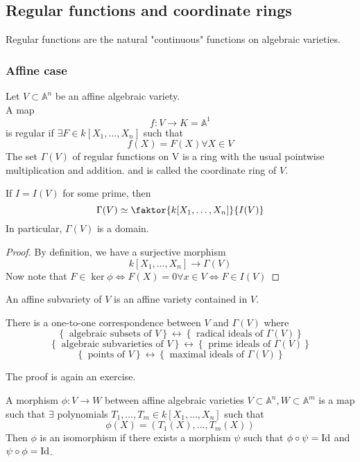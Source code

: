 \documentclass[../main.tex]{subfiles}
\begin{document}
\subsection{Regular functions and coordinate rings}
Regular functions are the natural "continuous" functions on algebraic varieties.
\subsubsection{Affine case}
\begin{defn}
	Let $V \subset \mathbb{A}^{n}$ be an affine algebraic variety.\\
	A map
	\[ 
	f:V\to K= \mathbb{A}^{1}
	\]
	is regular if $\exists F\in k[X_1,\ldots,X_n]$ such that 
	\[ 
	f( X) =F( X) \forall X\in V
	\]
	The set $\Gamma( V) $ of regular functions on V	is a ring with the usual pointwise multiplication and addition. and is called the coordinate ring of $V$.
	
\end{defn}
\begin{lemma}
If $I=I( V) $ for some prime, then
\[ 
	\Gamma( V) \simeq \faktor { k[X_1,\ldots,X_n]} { I( V) } 
\]
In particular, $\Gamma( V) $ is a domain.
\end{lemma}
\begin{proof}
By definition, we have a surjective morphism
\[ 
	k[X_1,\ldots,X_n] \to \Gamma( V) 
\]
Now note that $F\in \ker\phi \iff F( X) =0\forall x \in V \iff F\in I( V) $ 
\end{proof}
\begin{defn}[Subobjects]
	An affine subvariety of $V$ is an affine variety contained in $V$.
\end{defn}
\begin{lemma}
There is a one-to-one correspondence between $V$ and $\Gamma( V) $ where 
\[ 
\left\{ \text{ algebraic subsets of } V \right\} \leftrightarrow \left\{  \text{ radical ideals of } \Gamma( V)  \right\} 
\]
\[ 
\left\{ \text{ algebraic subvarieties of } V \right\} \leftrightarrow \left\{  \text{ prime ideals of } \Gamma( V)  \right\} 
\]
\[ 
\left\{ \text{ points of } V \right\} \leftrightarrow \left\{  \text{ maximal ideals of } \Gamma( V)  \right\} 
\]

\end{lemma}
The proof is again an exercise.
\begin{defn}[Morphism]
	A morphism $\phi:V\to W$ between affine algebraic varieties $V \subset \mathbb{A}^{n}, W \subset \mathbb{A}^{m}$ is a map such that $\exists$  polynomials $T_1,\ldots,T_m\in k[X_1,\ldots,X_n]$ such that
	\[ 
	\phi( X) = ( T_1( X) ,\ldots,T_m( X) ) 
	\]
	Then $\phi$ is an isomorphism if there exists a morphism $\psi$ such that $\phi\circ\psi= \operatorname{Id}$ and $\psi\circ\phi=\operatorname{Id}$.
		
\end{defn}
\end{document}
